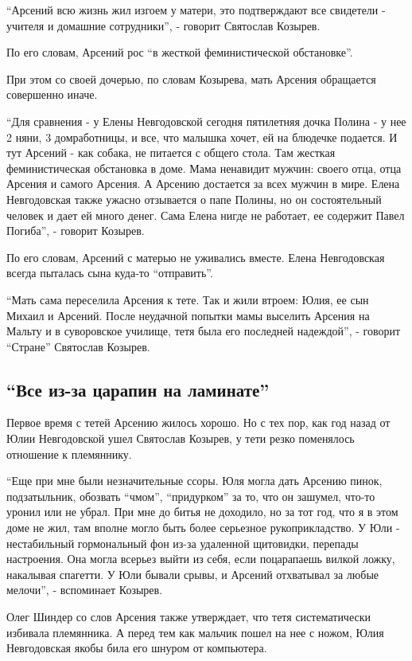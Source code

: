 “Арсений всю жизнь жил изгоем у матери, это подтверждают все свидетели -
учителя и домашние сотрудники”, - говорит Святослав Козырев. 

По его словам, Арсений рос “в жесткой феминистической обстановке”. 

При этом со своей дочерью, по словам Козырева, мать Арсения обращается
совершенно иначе.

“Для сравнения - у Елены Невгодовской сегодня пятилетняя дочка Полина - у нее 2
няни, 3 домработницы, и все, что малышка хочет, ей на блюдечке подается. И тут
Арсений - как собака, не питается с общего стола. Там жесткая феминистическая
обстановка в доме. Мама ненавидит мужчин: своего отца, отца Арсения и самого
Арсения. А Арсению достается за всех мужчин в мире. Елена Невгодовская также
ужасно отзывается о папе Полины, но он состоятельный человек и дает ей много
денег. Сама Елена нигде не работает, ее содержит Павел Погиба”, - говорит
Козырев.

По его словам, Арсений с матерью не уживались вместе. Елена Невгодовская всегда
пыталась сына куда-то “отправить”.

“Мать сама переселила Арсения к тете. Так и жили втроем: Юлия, ее сын Михаил и
Арсений. После неудачной попытки мамы выселить Арсения на Мальту и в
суворовское училище, тетя была его последней надеждой”, - говорит “Стране”
Святослав Козырев.

\subsection{\enquote{Все из-за царапин на ламинате}}

Первое время с тетей Арсению жилось хорошо. Но с тех пор, как год назад от Юлии
Невгодовской ушел Святослав Козырев, у тети резко поменялось отношение к
племяннику. 

“Еще при мне были незначительные ссоры. Юля могла дать Арсению пинок,
подзатыльник, обозвать “чмом”, “придурком” за то, что он зашумел, что-то уронил
или не убрал. При мне до битья не доходило, но за тот год, что я в этом доме не
жил, там вполне могло быть более серьезное рукоприкладство. У Юли -
нестабильный гормональный фон из-за удаленной щитовидки, перепады настроения.
Она могла всерьез выйти из себя, если поцарапаешь вилкой ложку, накалывая
спагетти. У Юли бывали срывы, и Арсений отхватывал за любые мелочи”, -
вспоминает Козырев.

Олег Шиндер со слов Арсения также утверждает, что тетя систематически избивала
племянника. А перед тем как мальчик пошел на нее с ножом, Юлия Невгодовская
якобы била его шнуром от компьютера.

